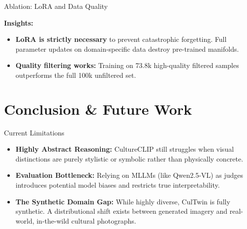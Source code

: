 \documentclass[aspectratio=169]{beamer}
\begin{document}
\begin{frame}{Ablation: LoRA and Data Quality}

  \begin{center}
  \end{center}

  \vspace{0.4cm}
  \textbf{Insights:}
  \begin{itemize}
    \item \textbf{LoRA is strictly necessary} to prevent catastrophic forgetting. Full parameter updates on domain-specific data destroy pre-trained manifolds.
    \item \textbf{Quality filtering works:} Training on 73.8k high-quality filtered samples outperforms the full 100k unfiltered set.
  \end{itemize}

\end{frame}

\section{Conclusion \& Future Work}

\begin{frame}{Current Limitations}
  
  \begin{itemize}
    \setlength{\itemsep}{0.6cm}
    \item \textbf{Highly Abstract Reasoning:} CultureCLIP still struggles when visual distinctions are purely stylistic or symbolic rather than physically concrete.
    \item \textbf{Evaluation Bottleneck:} Relying on MLLMs (like Qwen2.5-VL) as judges introduces potential model biases and restricts true interpretability.
    \item \textbf{The Synthetic Domain Gap:} While highly diverse, CulTwin is fully synthetic. A distributional shift exists between generated imagery and real-world, in-the-wild cultural photographs.
  \end{itemize}
  
\end{frame}
\end{document}
